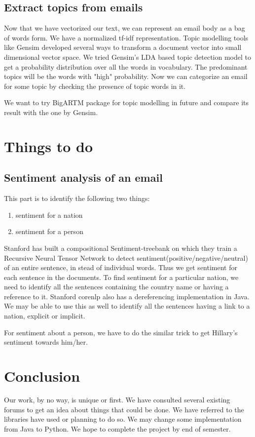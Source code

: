 \documentclass[12pt]{article}
\begin{document}
\subsection{Extract topics from emails}
Now that we have vectorized our text, we can represent an email body as a bag of words form. We have a normalized tf-idf representation. Topic modelling tools like Gensim developed several ways to transform a document vector into small dimensional vector space. We tried Gensim's LDA based topic detection model to get a probability distribution over all the words in vocabulary. The predominant topics will be the words with "high" probability. Now we can categorize an email for some topic by checking the presence of topic words in it.

We want to try BigARTM package for topic modelling in future and compare its result with the one by Gensim.

\section{Things to do}

\subsection{Sentiment analysis of an email}
This part is to identify the following two things: 
\begin{enumerate}
\item sentiment for a nation
\item sentiment for a person
\end{enumerate}
Stanford has built a compositional Sentiment-treebank on which they train a Recursive Neural Tensor Network to detect sentiment(positive/negative/neutral) of an entire sentence, in stead of individual words. Thus we get sentiment for each sentence in the documents. To find sentiment for a particular nation, we need to identify all the sentences containing the country name or having a reference to it. Stanford corenlp also has a dereferencing implementation in Java. We may be able to use this as well to identify all the sentences having a link to a nation, explicit or implicit.

For sentiment about a person, we have to do the similar trick to get Hillary's sentiment towards him/her.

\section{Conclusion}
Our work, by no way, is unique or first. We have consulted several existing forums to get an idea about things that could be done. We have referred to the libraries have used or planning to do so. We may change some implementation from Java to Python. We hope to complete the project by end of semester.
\end{document}
